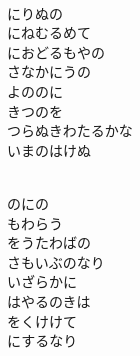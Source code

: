 \documentclass[10pt,b5j]{tarticle} %
\begin{document}
\begin{enumerate}
\begin{minipage}[c]{\blocksize}
        \vspace{\linespace}
        \item~\\
        にりぬの\\
        にねむるめて\\
        におどるもやの\\
        さなかにうの\\
        よののに\\
        きつのを\\
        つらぬきわたるかな\\
        いまのはけぬ
        
    \end{minipage}
    \begin{minipage}[c]{\blocksize}
        
        \vspace{\linespace}
        \item~\\
        のにの\\
        もわらう\\
        をうたわばの\\
        さもいぶのなり\\
        いざらかに\\
        はやるのきは\\
        をくけけて\\
        にするなり
    
    \end{minipage}
\end{enumerate} %
\end{document}

